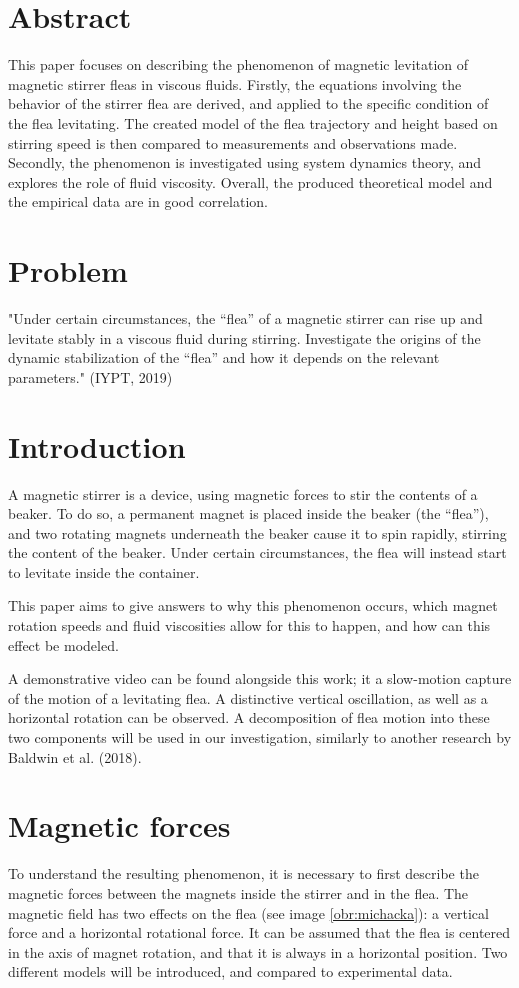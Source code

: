 \documentclass[10pt,a4paper]{article}
\begin{document}
\section*{Abstract}
This paper focuses on describing the phenomenon of magnetic levitation of magnetic stirrer fleas in viscous fluids. Firstly, the equations involving the behavior of the stirrer flea are derived, and applied to  the specific condition of the flea levitating. The created model of the flea trajectory and height based on  stirring speed is then compared to measurements and observations made. Secondly, the phenomenon is investigated using system dynamics theory, and explores the role of fluid viscosity. Overall, the produced theoretical model and the empirical data are in good correlation.

\tableofcontents

\newpage

\section{Problem}
"Under certain circumstances, the “flea” of a magnetic stirrer can rise up and levitate stably in a viscous fluid during stirring. Investigate the origins of the dynamic stabilization of the “flea” and how it depends on the relevant parameters." (IYPT, 2019)

\section{Introduction}
A magnetic stirrer is a device, using magnetic forces to stir the contents of a beaker. To do so, a permanent magnet is placed inside the beaker (the “flea”), and two rotating magnets underneath the beaker cause it to spin rapidly, stirring the content of the beaker. Under certain circumstances, the flea will instead start to levitate inside the container.\par  This paper aims to give answers to why this phenomenon occurs, which magnet rotation speeds and fluid viscosities allow for this to happen, and how can this effect be modeled.\par A demonstrative video can be found alongside this work; it a slow-motion capture of the motion of a levitating flea. A distinctive vertical oscillation, as well as a horizontal rotation can be observed. A decomposition of flea motion into these two components will be used in our investigation, similarly to another research by Baldwin et al. (2018).

\section{Magnetic forces}
To understand the resulting phenomenon, it is necessary to first describe the magnetic forces between the magnets inside the stirrer and in the flea. The magnetic field has two effects on the flea (see image \ref{obr:michacka}): a vertical force and a horizontal rotational force. It can be assumed that the flea is centered in the axis of magnet rotation, and that it is always in a horizontal position. Two different models will be introduced, and compared to experimental data.
\end{document}
